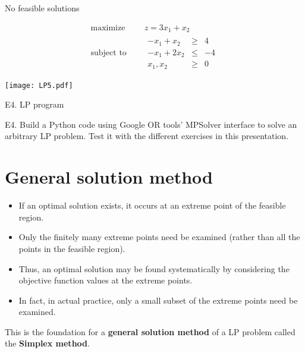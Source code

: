 \documentclass[c]{beamer}
\begin{document}
\begin{frame}[allowframebreaks]{No feasible solutions}
  \begin{Exercise}
    \begin{equation*}
      \begin{aligned}
        \text{maximize } \quad & z = 3x_1 + x_2 \\
        \text{subject to }\quad &
        \begin{array}{rcl}
          -x_1 + x_2 &\geq& 4\\
          -x_1 +2x_2 &\leq& -4\\
          x_1,x_2 &\geq &0
        \end{array}
      \end{aligned}
    \end{equation*}
  \end{Exercise}
  \framebreak
  \begin{center}
    \texttt{[image: LP5.pdf]}
  \end{center}

\end{frame}

\begin{frame}[t]{E4. LP program}
\begin{program}
  E4. Build a Python code using Google OR tools' MPSolver interface to solve an arbitrary LP problem. Test it with the different exercises in this presentation.
\end{program}
\end{frame}

\section{General solution method}

\begin{frame}
  \begin{itemize}
    \item If an optimal solution exists, it occurs at an extreme point of the feasible region.
    \item Only the finitely many extreme points need be examined (rather than all the points in the feasible region).
    \item Thus, an optimal solution may be found systematically by considering the objective function values at the extreme points.
    \item In fact, in actual practice, only a small subset of the extreme points need be examined.
  \end{itemize}
  This is the foundation for a {\bf general solution method} of a LP problem called the {\bf Simplex method}.
\end{frame}
\end{document}
